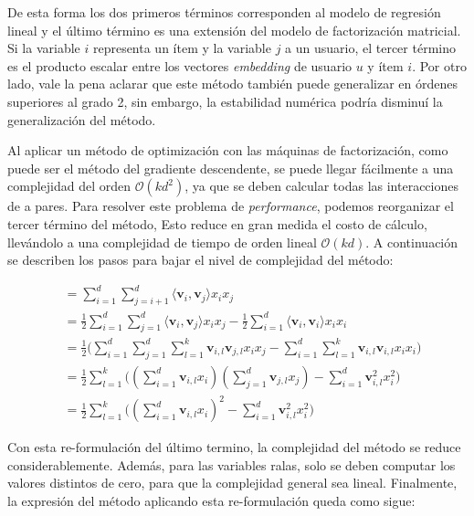 \documentclass[11pt,a4paper,twoside]{thesis}
\begin{document}
De esta forma los dos primeros términos corresponden al modelo de regresión
lineal y el último término es una extensión del modelo de factorización
matricial. Si la variable $i$ representa un ítem y la variable $j$ a un
usuario, el tercer término es el producto escalar entre los vectores
\textit{embedding} de usuario $u$ y ítem $i$. Por otro lado, vale la pena
aclarar que este método también puede generalizar en órdenes superiores al
grado 2, sin embargo, la estabilidad numérica podría disminuí la generalización
del método.

Al aplicar un método de optimización con las máquinas de factorización, como
puede ser el método del gradiente descendente, se puede llegar fácilmente a una
complejidad del orden $\mathcal{O}(kd^2)$, ya que se deben calcular todas las
interacciones de a pares. Para resolver este problema de \textit{performance},
podemos reorganizar el tercer término del método, Esto reduce en gran medida el
costo de cálculo, llevándolo a una complejidad de tiempo de orden lineal
$\mathcal{O}(kd)$. A continuación se describen los pasos para bajar el nivel de
complejidad del método:

\begin{equation}
	\begin{split}
		&=\sum_{i=1}^d \sum_{j=i+1}^d \langle\mathbf{v}_i, \mathbf{v}_j\rangle x_i x_j \\
		&= \frac{1}{2} \sum_{i=1}^d \sum_{j=1}^d\langle\mathbf{v}_i, \mathbf{v}_j\rangle x_i x_j - \frac{1}{2}\sum_{i=1}^d \langle\mathbf{v}_i, \mathbf{v}_i\rangle x_i x_i \\
		&= \frac{1}{2} \big (\sum_{i=1}^d \sum_{j=1}^d \sum_{l=1}^k\mathbf{v}_{i, l} \mathbf{v}_{j, l} x_i x_j - \sum_{i=1}^d \sum_{l=1}^k \mathbf{v}_{i, l} \mathbf{v}_{i, l} x_i x_i \big)\\
		&=  \frac{1}{2} \sum_{l=1}^k \big ((\sum_{i=1}^d \mathbf{v}_{i, l} x_i) (\sum_{j=1}^d \mathbf{v}_{j, l}x_j) - \sum_{i=1}^d \mathbf{v}_{i, l}^2 x_i^2 \big ) \\
		&= \frac{1}{2} \sum_{l=1}^k \big ((\sum_{i=1}^d \mathbf{v}_{i, l} x_i)^2 - \sum_{i=1}^d \mathbf{v}_{i, l}^2 x_i^2)
	\end{split}
\end{equation}

Con esta re-formulación del último termino, la complejidad del método se reduce
considerablemente. Además, para las variables ralas, solo se deben computar los
valores distintos de cero, para que la complejidad general sea lineal.
Finalmente, la expresión del método aplicando esta re-formulación queda como
sigue:
\end{document}
